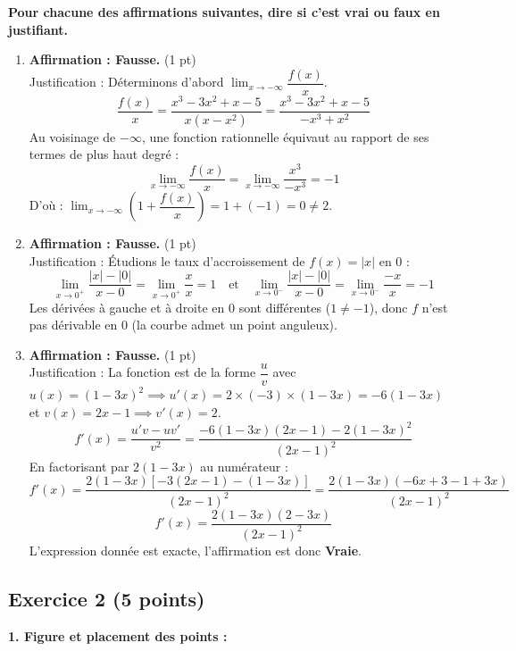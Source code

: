 \documentclass[12pt,a4paper]{article}
\begin{document}
\noindent\textbf{Pour chacune des affirmations suivantes, dire si c'est vrai ou faux en justifiant.}
\begin{enumerate}
    \item[\textbf{1.}] \textbf{Affirmation : Fausse.} \hfill (1 pt) \\
    Justification : Déterminons d'abord $\lim_{x\rightarrow-\infty} \dfrac{f(x)}{x}$. 
    \[ \frac{f(x)}{x} = \frac{x^{3}-3x^{2}+x-5}{x(x-x^{2})} = \frac{x^{3}-3x^{2}+x-5}{-x^3+x^2} \]
    Au voisinage de $-\infty$, une fonction rationnelle équivaut au rapport de ses termes de plus haut degré :
    \[ \lim_{x\rightarrow-\infty} \frac{f(x)}{x} = \lim_{x\rightarrow-\infty} \frac{x^3}{-x^3} = -1 \]
    D'où : $\lim_{x\rightarrow-\infty}\left(1+\dfrac{f(x)}{x}\right) = 1 + (-1) = 0 \neq 2$.
    
    \item[\textbf{2.}] \textbf{Affirmation : Fausse.} \hfill (1 pt) \\
    Justification : Étudions le taux d'accroissement de $f(x) = |x|$ en 0 :
    \[ \lim_{x \to 0^+} \frac{|x| - |0|}{x - 0} = \lim_{x \to 0^+} \frac{x}{x} = 1 \quad \text{et} \quad \lim_{x \to 0^-} \frac{|x| - |0|}{x - 0} = \lim_{x \to 0^-} \frac{-x}{x} = -1 \]
    Les dérivées à gauche et à droite en 0 sont différentes ($1 \neq -1$), donc $f$ n'est pas dérivable en 0 (la courbe admet un point anguleux).
    
    \item[\textbf{3.}] \textbf{Affirmation : Fausse.} \hfill (1 pt) \\
    Justification : La fonction est de la forme $\dfrac{u}{v}$ avec $u(x) = (1-3x)^2 \implies u'(x) = 2 \times (-3) \times (1-3x) = -6(1-3x)$ et $v(x) = 2x-1 \implies v'(x) = 2$.
    \[ f'(x) = \frac{u'v - uv'}{v^2} = \frac{-6(1-3x)(2x-1) - 2(1-3x)^2}{(2x-1)^2} \]
    En factorisant par $2(1-3x)$ au numérateur :
    \[ f'(x) = \frac{2(1-3x)\left[-3(2x-1) - (1-3x)\right]}{(2x-1)^2} = \frac{2(1-3x)(-6x+3-1+3x)}{(2x-1)^2} \]
    \[ f'(x) = \frac{2(1-3x)(2-3x)}{(2x-1)^2} \]
    L'expression donnée est exacte, l'affirmation est donc \textbf{Vraie}.
\end{enumerate}

\smallbreak
\hrulefill
\smallbreak

\subsection*{Exercice 2 \hfill (5 points)}

\noindent \textbf{1. Figure et placement des points :} \\
\end{document}
